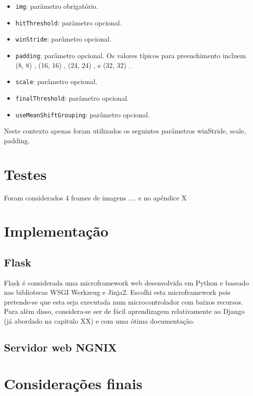 \begin{itemize}
	\item \texttt{img}: parâmetro obrigatório. 
	\item \texttt{hitThreshold}: parâmetro opcional. 
	\item \texttt{winStride}: parâmetro opcional. 
	\item \texttt{padding}: parâmetro opcional.  Os valores típicos para preenchimento incluem  (8, 8) ,  (16, 16) ,  (24, 24) , e  (32, 32) .
	
		
	\item \texttt{scale}: parâmetro opcional. 
	\item \texttt{finalThreshold}: parâmetro opcional. 
	\item \texttt{useMeanShiftGrouping}: parâmetro opcional. 
\end{itemize}





Neste contexto apenas foram utilizados os seguintes parâmetros winStride, scale, padding. 



\section{Testes}

Foram considerados 4 frames de imagens .... e no apêndice X




\section{Implementação}


\subsection{Flask}

Flask é considerada uma microframework web desenvolvida em Python e baseado nas bibliotecas WSGI Werkzeug e Jinja2. Escolhi esta microframework pois pretende-se que esta seja executada num microcontrolador com baixos recursos. Para além disso, considera-se ser de fácil aprendizagem relativamente ao Django (já abordado na capitulo XX) e com uma ótima documentação. 




\subsection{Servidor web NGNIX}

\section{Considerações finais}

